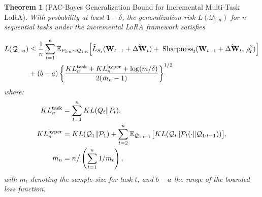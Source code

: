 \documentclass[letterpaper]{article} %
\newtheorem{theorem}{Theorem}
\begin{document}
\begin{theorem}[PAC-Bayes Generalization Bound for Incremental Multi-Task LoRA]
With probability at least $1-\delta$, the generalization risk $L(\mathcal{Q}_{1:n})$ for $n$ sequential tasks under the incremental LoRA framework satisfies

\begin{align}
L(\mathcal{Q}_{1:n}) &\leq \frac{1}{n} \sum_{t=1}^n 
    \mathbb{E}_{P_{1:n} \sim \mathcal{Q}_{1:n}}
    \Big[
        \widehat{L}_{S_t}(\mathbf{W}_{t-1} + \hat{\Delta\mathbf{W}}_t)
     +\; \mathrm{Sharpness}_t(\mathbf{W}_{t-1} + \hat{\Delta\mathbf{W}}_t,\, \rho_t^2)
    \Big] 
    \notag \\
& + (b-a) \left\{ 
    \frac{KL_n^{\text{task}} + KL_n^{\text{hyper}} + \log(m/\delta)}
         {2(\bar{m}_n - 1)}
\right\}^{1/2}
\label{eq:lora-pac-bayes-bound}
\end{align}
where:
\begin{align}
KL_n^{\mathrm{task}} &= \sum_{t=1}^n KL(Q_t\|P_t), \notag  \\
KL_n^{\mathrm{hyper}} &= KL(\mathcal{Q}_1 \| \mathcal{P}_1) +\sum_{t=2}^n \mathbb{E}_{\mathcal{Q}_{1:t-1}}\big[KL(\mathcal{Q}_t \| \mathcal{P}_t(\cdot \| \mathcal{Q}_{1:t-1}))\big], \notag\\
\bar{m}_n &= n \big/ \left(\sum_{t=1}^n 1/m_t\right), \notag
\end{align}
with $m_t$ denoting the sample size for task $t$, and $b-a$ the range of the bounded loss function.
\end{theorem}
\end{document}
